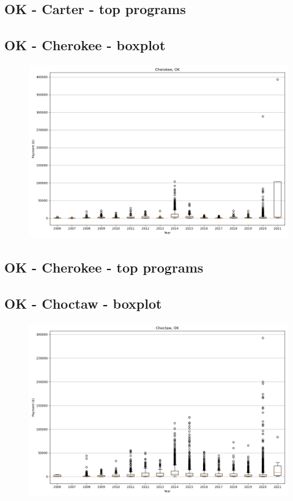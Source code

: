 \subsection*{OK - Carter - top programs}

\newpage
\subsection*{OK - Cherokee - boxplot}
\begin{figure}[h]
\centering
\includegraphics[width=7in]{../output/boxplots/counties/Cherokee-OK_boxplot.png}
\end{figure}


\subsection*{OK - Cherokee - top programs}

\newpage
\subsection*{OK - Choctaw - boxplot}
\begin{figure}[h]
\centering
\includegraphics[width=7in]{../output/boxplots/counties/Choctaw-OK_boxplot.png}
\end{figure}



